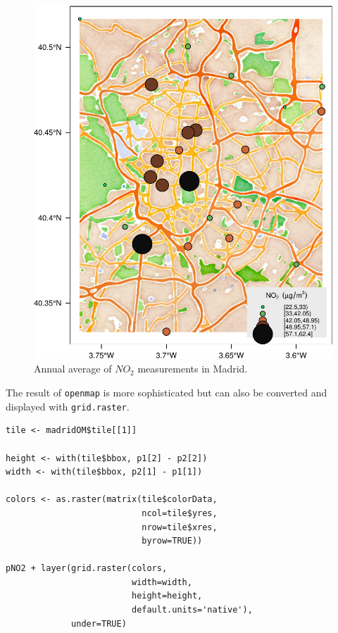 \documentclass[smallroyalvopaper]{memoir}
\begin{document}
\begin{figure}[htb]
\centering
\includegraphics[width=.9\linewidth]{figs/airMadrid_stamen.pdf}
\caption{\label{fig:airMadrid_stamen}Annual average of $NO_2$ measurements in Madrid.}
\end{figure}

The result of \texttt{openmap} is more sophisticated but can also be
converted and displayed with \texttt{grid.raster}.
\lstset{language=R,numbers=none}
\begin{lstlisting}
tile <- madridOM$tile[[1]]

height <- with(tile$bbox, p1[2] - p2[2])
width <- with(tile$bbox, p2[1] - p1[1])

colors <- as.raster(matrix(tile$colorData,
                           ncol=tile$yres,
                           nrow=tile$xres,
                           byrow=TRUE))

pNO2 + layer(grid.raster(colors,
                         width=width,
                         height=height,
                         default.units='native'),
             under=TRUE)
\end{lstlisting}
\end{document}
